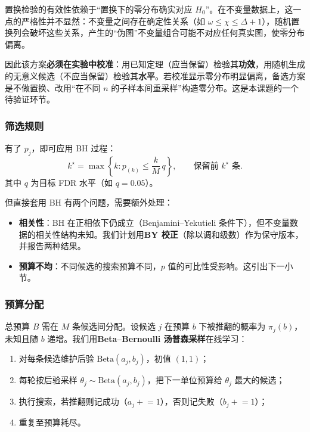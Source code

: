 \begin{notebox}
置换检验的有效性依赖于“置换下的零分布确实对应 $H_0$”。在不变量数据上，这一点的严格性并不显然：不变量之间存在确定性关系（如 $\omega\le\chi\le\Delta+1$），随机置换列会破坏这些关系，产生的“伪图”不变量组合可能不对应任何真实图，使零分布偏离。

因此该方案\textbf{必须在实验中校准}：用已知定理（应当保留）检验其\textbf{功效}，用随机生成的无意义候选（不应当保留）检验其\textbf{水平}。若校准显示零分布明显偏离，备选方案是不做置换、改用“在不同 $n$ 的子样本间重采样”构造零分布。这是本课题的一个待验证环节。
\end{notebox}

\subsubsection{筛选规则}

有了 $p_j$，即可应用 BH 过程：
\begin{equation}
  k^{\star} = \max\left\{k : p_{(k)} \le \frac{k}{M}\,q\right\},
  \qquad \text{保留前 } k^{\star} \text{ 条}.
  \label{eq:bh}
\end{equation}
其中 $q$ 为目标 FDR 水平（如 $q=0.05$）。

但直接套用 BH 有两个问题，需要额外处理：
\begin{itemize}
  \item \textbf{相关性}：BH 在正相依下仍成立（Benjamini–Yekutieli 条件下），但不变量数据的相关性结构未知。我们计划用\textbf{BY 校正}（除以调和级数）作为保守版本，并报告两种结果。
  \item \textbf{预算不均}：不同候选的搜索预算不同，$p$ 值的可比性受影响。这引出下一小节。
\end{itemize}

\subsubsection{预算分配}

总预算 $B$ 需在 $M$ 条候选间分配。设候选 $j$ 在预算 $b$ 下被推翻的概率为 $\pi_j(b)$，未知且随 $b$ 递增。我们用\textbf{Beta–Bernoulli 汤普森采样}在线学习：

\begin{enumerate}[label=\arabic*.]
  \item 对每条候选维护后验 $\mathrm{Beta}(a_j,b_j)$，初值 $(1,1)$；
  \item 每轮按后验采样 $\theta_j\sim\mathrm{Beta}(a_j,b_j)$，把下一单位预算给 $\theta_j$ 最大的候选；
  \item 执行搜索，若推翻则记成功（$a_j\mathrel{+}=1$），否则记失败（$b_j\mathrel{+}=1$）；
  \item 重复至预算耗尽。
\end{enumerate}

